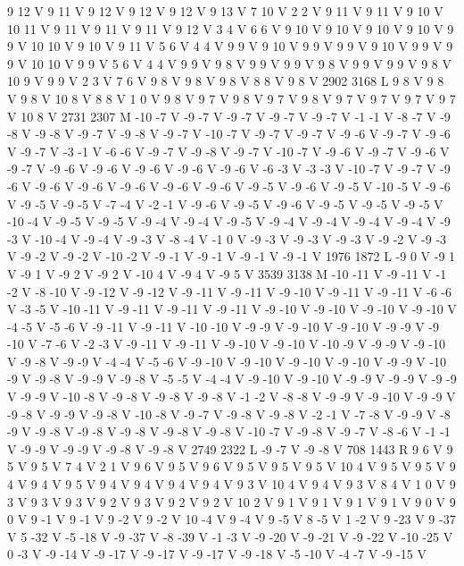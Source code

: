{{{{{9 12 V
9 11 V
9 12 V
9 12 V
9 12 V
9 13 V
7 10 V
2 2 V
9 11 V
9 11 V
9 10 V
10 11 V
9 11 V
9 11 V
9 11 V
9 12 V
3 4 V
6 6 V
9 10 V
9 10 V
9 10 V
9 10 V
9 9 V
10 10 V
9 10 V
9 11 V
5 6 V
4 4 V
9 9 V
9 10 V
9 9 V
9 9 V
9 10 V
9 9 V
9 9 V
10 10 V
9 9 V
5 6 V
4 4 V
9 9 V
9 8 V
9 9 V
9 9 V
9 8 V
9 9 V
9 9 V
9 8 V
10 9 V
9 9 V
2 3 V
7 6 V
9 8 V
9 8 V
9 8 V
8 8 V
9 8 V
2902 3168 L
9 8 V
9 8 V
9 8 V
10 8 V
8 8 V
1 0 V
9 8 V
9 7 V
9 8 V
9 7 V
9 8 V
9 7 V
9 7 V
9 7 V
9 7 V
10 8 V
2731 2307 M
-10 -7 V
-9 -7 V
-9 -7 V
-9 -7 V
-9 -7 V
-1 -1 V
-8 -7 V
-9 -8 V
-9 -8 V
-9 -7 V
-9 -8 V
-9 -7 V
-10 -7 V
-9 -7 V
-9 -7 V
-9 -6 V
-9 -7 V
-9 -6 V
-9 -7 V
-3 -1 V
-6 -6 V
-9 -7 V
-9 -8 V
-9 -7 V
-10 -7 V
-9 -6 V
-9 -7 V
-9 -6 V
-9 -7 V
-9 -6 V
-9 -6 V
-9 -6 V
-9 -6 V
-9 -6 V
-6 -3 V
-3 -3 V
-10 -7 V
-9 -7 V
-9 -6 V
-9 -6 V
-9 -6 V
-9 -6 V
-9 -6 V
-9 -6 V
-9 -5 V
-9 -6 V
-9 -5 V
-10 -5 V
-9 -6 V
-9 -5 V
-9 -5 V
-7 -4 V
-2 -1 V
-9 -6 V
-9 -5 V
-9 -6 V
-9 -5 V
-9 -5 V
-9 -5 V
-10 -4 V
-9 -5 V
-9 -5 V
-9 -4 V
-9 -4 V
-9 -5 V
-9 -4 V
-9 -4 V
-9 -4 V
-9 -4 V
-9 -3 V
-10 -4 V
-9 -4 V
-9 -3 V
-8 -4 V
-1 0 V
-9 -3 V
-9 -3 V
-9 -3 V
-9 -2 V
-9 -3 V
-9 -2 V
-9 -2 V
-10 -2 V
-9 -1 V
-9 -1 V
-9 -1 V
-9 -1 V
1976 1872 L
-9 0 V
-9 1 V
-9 1 V
-9 2 V
-9 2 V
-10 4 V
-9 4 V
-9 5 V
3539 3138 M
-10 -11 V
-9 -11 V
-1 -2 V
-8 -10 V
-9 -12 V
-9 -12 V
-9 -11 V
-9 -11 V
-9 -10 V
-9 -11 V
-9 -11 V
-6 -6 V
-3 -5 V
-10 -11 V
-9 -11 V
-9 -11 V
-9 -11 V
-9 -10 V
-9 -10 V
-9 -10 V
-9 -10 V
-4 -5 V
-5 -6 V
-9 -11 V
-9 -11 V
-10 -10 V
-9 -9 V
-9 -10 V
-9 -10 V
-9 -9 V
-9 -10 V
-7 -6 V
-2 -3 V
-9 -11 V
-9 -11 V
-9 -10 V
-9 -10 V
-10 -9 V
-9 -9 V
-9 -10 V
-9 -8 V
-9 -9 V
-4 -4 V
-5 -6 V
-9 -10 V
-9 -10 V
-9 -10 V
-9 -10 V
-9 -9 V
-10 -9 V
-9 -8 V
-9 -9 V
-9 -8 V
-5 -5 V
-4 -4 V
-9 -10 V
-9 -10 V
-9 -9 V
-9 -9 V
-9 -9 V
-9 -9 V
-10 -8 V
-9 -8 V
-9 -8 V
-9 -8 V
-1 -2 V
-8 -8 V
-9 -9 V
-9 -10 V
-9 -9 V
-9 -8 V
-9 -9 V
-9 -8 V
-10 -8 V
-9 -7 V
-9 -8 V
-9 -8 V
-2 -1 V
-7 -8 V
-9 -9 V
-8 -9 V
-9 -8 V
-9 -8 V
-9 -8 V
-9 -8 V
-9 -8 V
-10 -7 V
-9 -8 V
-9 -7 V
-8 -6 V
-1 -1 V
-9 -9 V
-9 -9 V
-9 -8 V
-9 -8 V
2749 2322 L
-9 -7 V
-9 -8 V
708 1443 R
9 6 V
9 5 V
9 5 V
7 4 V
2 1 V
9 6 V
9 5 V
9 6 V
9 5 V
9 5 V
9 5 V
10 4 V
9 5 V
9 5 V
9 4 V
9 4 V
9 5 V
9 4 V
9 4 V
9 4 V
9 4 V
9 3 V
10 4 V
9 4 V
9 3 V
8 4 V
1 0 V
9 3 V
9 3 V
9 3 V
9 2 V
9 3 V
9 2 V
9 2 V
10 2 V
9 1 V
9 1 V
9 1 V
9 1 V
9 0 V
9 0 V
9 -1 V
9 -1 V
9 -2 V
9 -2 V
10 -4 V
9 -4 V
9 -5 V
8 -5 V
1 -2 V
9 -23 V
9 -37 V
5 -32 V
-5 -18 V
-9 -37 V
-8 -39 V
-1 -3 V
-9 -20 V
-9 -21 V
-9 -22 V
-10 -25 V
0 -3 V
-9 -14 V
-9 -17 V
-9 -17 V
-9 -17 V
-9 -18 V
-5 -10 V
-4 -7 V
-9 -15 V
}}}}}
